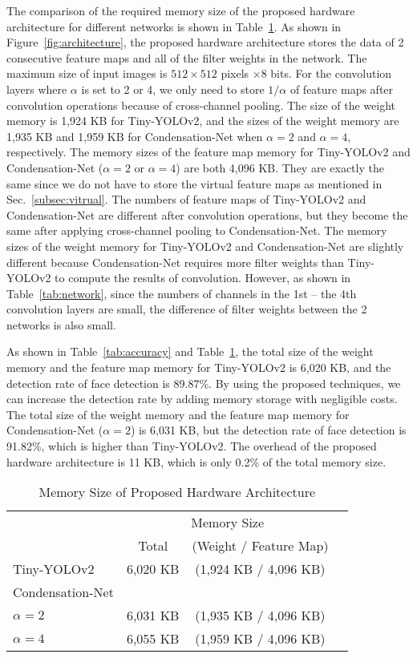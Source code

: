 \documentclass[10pt,twocolumn,letterpaper]{article}
\begin{document}
The comparison of the required memory size of the proposed hardware architecture for different networks is shown in Table~\ref{tab:size}. As shown in Figure~\ref{fig:architecture}, the proposed hardware architecture stores the data of 2 consecutive feature maps and all of the filter weights in the network. The maximum size of input images is $512 \times 512$ pixels $\times 8$ bits. For the convolution layers where $\alpha$ is set to 2 or 4, we only need to store $1/\alpha$ of feature maps after convolution operations because of cross-channel pooling. The size of the weight memory is 1,924 KB for Tiny-YOLOv2, and the sizes of the weight memory are 1,935 KB and 1,959 KB for Condensation-Net when $\alpha = 2$ and $\alpha = 4$, respectively. The memory sizes of the feature map memory for Tiny-YOLOv2 and Condensation-Net ($\alpha = 2$ or $\alpha = 4$) are both 4,096 KB. They are exactly the same since we do not have to store the virtual feature maps as mentioned in Sec.~\ref{subsec:vitrual}. The numbers of feature maps of Tiny-YOLOv2 and Condensation-Net are different after convolution operations, but they become the same after applying cross-channel pooling to Condensation-Net. The memory sizes of the weight memory for Tiny-YOLOv2 and Condensation-Net are slightly different because Condensation-Net requires more filter weights than Tiny-YOLOv2 to compute the results of convolution. However, as shown in Table~\ref{tab:network}, since the numbers of channels in the 1st -- the 4th convolution layers are small, the difference of filter weights between the 2 networks is also small.

As shown in Table~\ref{tab:accuracy} and Table~\ref{tab:size}, the total size of the weight memory and the feature map memory for Tiny-YOLOv2 is 6,020 KB, and the detection rate of face detection is 89.87\%. By using the proposed techniques, we can increase the detection rate by adding memory storage with negligible costs. The total size of the weight memory and the feature map memory for Condensation-Net ($\alpha = 2$) is 6,031 KB, but the detection rate of face detection is 91.82\%, which is higher than Tiny-YOLOv2. The overhead of the proposed hardware architecture is 11 KB, which is only 0.2\% of the total memory size.

\begin{table}
\begin{center}
\begin{tabular}{l|ccc}
\hline
           & \multicolumn{2}{c}{Memory Size}\\  
           & Total & (Weight / Feature Map)\\
\hline\hline
Tiny-YOLOv2                        &  6,020 KB & (1,924 KB / 4,096 KB) \\
\hline
Condensation-Net\\
$\alpha = 2$                     &  6,031 KB & (1,935 KB / 4,096 KB) \\
$\alpha = 4$                     &  6,055 KB & (1,959 KB / 4,096 KB) \\
\hline
\end{tabular}
\end{center}
\caption{Memory Size of Proposed Hardware Architecture}
\label{tab:size}
\end{table}
\end{document}
